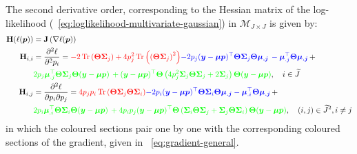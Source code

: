 \documentclass[long, final]{jobim}
\DeclareMathOperator*{\Tr}{Tr}
\begin{document}
The second derivative order, corresponding to the Hessian matrix of the log-likelihood (\equationname~\ref{eq:loglikelihood-multivariate-gaussian}) in $\mathcal{M}_{J \times J}$ is given by: 
\begin{equation}
    \label{eq:hessian-log-likelihood-unconstrained}
\begin{aligned}
\mathbf{H}(\ell(\boldsymbol{p})) &= \mathbf{J}\left( \nabla \ell (\boldsymbol{p})\right)\\
\mathbf{H}_{i,i}& =
   \frac{\partial^2 \ell}{\partial^2 p_i} =
\textcolor{red}{-2\Tr \left(\boldsymbol{\Theta}\boldsymbol{\Sigma}_j\right) + 4p_j^2 \Tr \left(\left(\boldsymbol{\Theta}\boldsymbol{\Sigma}_j\right)^2\right)} 
\textcolor{blue}{-2p_j(\boldsymbol{y} - \boldsymbol{\mu} \boldsymbol{p})^\top\boldsymbol{\Theta} \boldsymbol{\Sigma}_j \boldsymbol{\Theta} \boldsymbol{\mu_{.j}}\, - \boldsymbol{\mu}_{.j}^\top\boldsymbol{\Theta} \boldsymbol{\mu_{.j}}} \, + \\
& \textcolor{green}{2p_j \boldsymbol{\mu}_{.j}^\top\boldsymbol{\Theta}\boldsymbol{\Sigma}_j\boldsymbol{\Theta} (\boldsymbol{y} - \boldsymbol{\mu} \boldsymbol{p})\, + 
(\boldsymbol{y} - \boldsymbol{\mu} \boldsymbol{p})^\top\boldsymbol{\Theta} \left(4p_j^2 \boldsymbol{\Sigma}_j \boldsymbol{\Theta} \boldsymbol{\Sigma}_j + 2 \boldsymbol{\Sigma}_j \right)\boldsymbol{\Theta} (\boldsymbol{y} - \boldsymbol{\mu} \boldsymbol{p})}, \quad i \in \widetilde{J} \\
\mathbf{H}_{i,j} &=
   \frac{\partial^2 \ell}{\partial p_i \partial p_j} =
\textcolor{red}{4p_j p_i \Tr \left(\boldsymbol{\Theta}\boldsymbol{\Sigma}_j \boldsymbol{\Theta}\boldsymbol{\Sigma}_i \right)}
\textcolor{blue}{-2p_i(\boldsymbol{y} - \boldsymbol{\mu} \boldsymbol{p})^\top\boldsymbol{\Theta} \boldsymbol{\Sigma}_i \boldsymbol{\Theta} \boldsymbol{\mu_{.j}} - \boldsymbol{\mu}_{.i}^\top\boldsymbol{\Theta} \boldsymbol{\mu_{.j}}} \, + \\
& \textcolor{green}{2p_i \boldsymbol{\mu}_{.i}^\top\boldsymbol{\Theta}\boldsymbol{\Sigma}_i\boldsymbol{\Theta} (\boldsymbol{y} - \boldsymbol{\mu} \boldsymbol{p})\, + 
4p_ip_j(\boldsymbol{y} - \boldsymbol{\mu} \boldsymbol{p})^\top\boldsymbol{\Theta} \left(\boldsymbol{\Sigma}_i \boldsymbol{\Theta} \boldsymbol{\Sigma}_j + \boldsymbol{\Sigma}_j \boldsymbol{\Theta} \boldsymbol{\Sigma}_i \right)\boldsymbol{\Theta} (\boldsymbol{y} - \boldsymbol{\mu} \boldsymbol{p})}, \quad (i,j) \in \widetilde{J}^2, i \neq j
  \end{aligned}
\end{equation}
in which the coloured sections pair one by one with the corresponding coloured sections of the gradient, given in \equationname~\ref{eq:gradient-general}.
\end{document}
